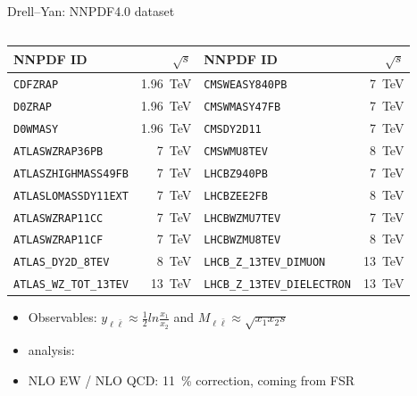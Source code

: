 \begin{frame}{Drell--Yan: NNPDF4.0 dataset}
\begin{columns}[T,onlytextwidth]
\begin{column}{.5\textwidth}
{\tiny
\begin{center}
\begin{tabular}{@{}l@{~}r@{~}|@{~}l@{~}r@{}}
\toprule
NNPDF ID & $\sqrt{s}$ & NNPDF ID & $\sqrt{s}$ \\
\midrule
\texttt{CDFZRAP} & \SI{1.96}{\tera\electronvolt} & 
\texttt{CMSWEASY840PB} & \SI{7}{\tera\electronvolt} \\
\texttt{D0ZRAP} & \SI{1.96}{\tera\electronvolt} & 
\texttt{CMSWMASY47FB} & \SI{7}{\tera\electronvolt} \\
\texttt{D0WMASY} & \SI{1.96}{\tera\electronvolt} & 
\alert{\texttt{CMSDY2D11}} & \alert{\SI{7}{\tera\electronvolt}} \\
\texttt{ATLASWZRAP36PB} & \SI{7}{\tera\electronvolt} & 
\texttt{CMSWMU8TEV} & \SI{8}{\tera\electronvolt} \\
\texttt{ATLASZHIGHMASS49FB} & \SI{7}{\tera\electronvolt} & 
\texttt{LHCBZ940PB} & \SI{7}{\tera\electronvolt} \\
\texttt{ATLASLOMASSDY11EXT} & \SI{7}{\tera\electronvolt} & 
\texttt{LHCBZEE2FB} & \SI{8}{\tera\electronvolt} \\
\texttt{ATLASWZRAP11CC} & \SI{7}{\tera\electronvolt} & 
\texttt{LHCBWZMU7TEV} & \SI{7}{\tera\electronvolt} \\
\texttt{ATLASWZRAP11CF} & \SI{7}{\tera\electronvolt} & 
\texttt{LHCBWZMU8TEV} & \SI{8}{\tera\electronvolt} \\
\texttt{ATLAS\_DY2D\_8TEV} & \SI{8}{\tera\electronvolt} & 
\texttt{LHCB\_Z\_13TEV\_DIMUON} & \SI{13}{\tera\electronvolt} \\
\texttt{ATLAS\_WZ\_TOT\_13TEV} & \SI{13}{\tera\electronvolt} & 
\texttt{LHCB\_Z\_13TEV\_DIELECTRON} & \SI{13}{\tera\electronvolt} \\
\bottomrule
\end{tabular}
\end{center}
}

\begin{itemize}
\item Observables:
$y_{\ell \bar{\ell}} \approx \frac{1}{2} ln \frac{x_1}{x_2}$ and $M_{\ell \bar{\ell}} \approx \sqrt{x_1 x_2 s}$
\item analysis: 
\item NLO EW / NLO QCD: \SI{+11}{\percent} correction, coming from FSR
\end{itemize}


\end{column}
\end{columns}
\end{frame}
